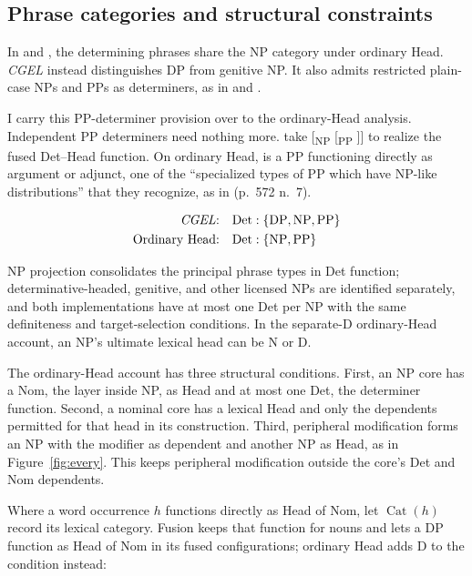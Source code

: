 \documentclass[12pt]{article}
\begin{document}
\subsection{Phrase categories and structural constraints}\label{sec:det-uniform}

In  and , the determining phrases share the NP category under ordinary Head. \textit{CGEL} instead distinguishes DP from genitive NP. It also admits restricted plain-case NPs and PPs as determiners, as in  and  \citep[Ch.~5, §4]{huddleston2002}.

I carry this PP-determiner provision over to the ordinary-Head analysis. Independent PP determiners need nothing more. \textcite[589]{Payne2007} take [\textsubscript{NP} [\textsubscript{PP} ]] to realize the fused Det--Head function. On ordinary Head,  is a PP functioning directly as argument or adjunct, one of the \enquote{specialized types of PP which have NP-like distributions} that they recognize, as in  (p.~572 n.~7).

\[
\begin{aligned}
\text{\textit{CGEL}:} &\quad \mathrm{Det}:\{\mathrm{DP},\mathrm{NP},\mathrm{PP}\} \\
\text{Ordinary Head:} &\quad \mathrm{Det}:\{\mathrm{NP},\mathrm{PP}\}
\end{aligned}
\]

NP projection consolidates the principal phrase types in Det function; determinative-headed, genitive, and other licensed NPs are identified separately, and both implementations have at most one Det per NP with the same definiteness and target-selection conditions. In the separate-D ordinary-Head account, an NP's ultimate lexical head can be N or D.

The ordinary-Head account has three structural conditions. First, an NP core has a Nom, the layer inside NP, as Head and at most one Det, the determiner function. Second, a nominal core has a lexical Head and only the dependents permitted for that head in its construction. Third, peripheral modification forms an NP with the modifier as dependent and another NP as Head, as in Figure~\ref{fig:every}. This keeps peripheral modification outside the core's Det and Nom dependents.

Where a word occurrence $h$ functions directly as Head of Nom, let $\operatorname{Cat}(h)$ record its lexical category. Fusion keeps that function for nouns and lets a DP function as Head of Nom in its fused configurations; ordinary Head adds D to the condition instead:
\end{document}

